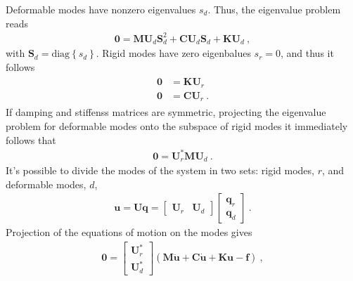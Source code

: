 \documentclass[letterpaper,10pt,english]{jupyterBook}
\begin{document}
\sphinxAtStartPar
Deformable modes have non\sphinxhyphen{}zero eigenvalues \(s_d\). Thus, the eigenvalue problem reads
\begin{equation*}
\begin{split}\mathbf{0} = \mathbf{M} \mathbf{U}_d \mathbf{S}^2_d + \mathbf{C} \mathbf{U}_d \mathbf{S}_d + \mathbf{K} \mathbf{U}_d \ ,\end{split}
\end{equation*}
\sphinxAtStartPar
with \(\mathbf{S}_d = \text{diag}\left\{ s_d \right\}\). Rigid modes have zero eigenbalues \(s_r = 0\), and thus it follows
\begin{equation*}
\begin{split}\begin{aligned}
  \mathbf{0} & = \mathbf{K} \mathbf{U}_r \\
  \mathbf{0} & = \mathbf{C} \mathbf{U}_r \ .
\end{aligned}\end{split}
\end{equation*}
\sphinxAtStartPar
If damping and stiffenss matrices are symmetric, projecting the eigenvalue problem for deformable modes onto the subspace of rigid modes it immediately follows that
\begin{equation*}
\begin{split}\mathbf{0} = \mathbf{U}_r^* \mathbf{M} \mathbf{U}_d \ .\end{split}
\end{equation*}
\sphinxAtStartPar
It’s possible to divide the modes of the system in two sets: rigid modes, \(r\), and deformable modes, \(d\),
\begin{equation*}
\begin{split}\mathbf{u} = \mathbf{U} \mathbf{q} = \begin{bmatrix} \mathbf{U}_r & \mathbf{U}_d \end{bmatrix} \begin{bmatrix} \mathbf{q}_r \\ \mathbf{q}_d \end{bmatrix} \ .\end{split}
\end{equation*}
\sphinxAtStartPar
Projection of the equations of motion on the modes gives
\begin{equation*}
\begin{split}\mathbf{0} = \begin{bmatrix} \mathbf{U}_r^* \\ \mathbf{U}_d^* \end{bmatrix} \left( \mathbf{M} \ddot{\mathbf{u}} + \mathbf{C} \dot{\mathbf{u}} + \mathbf{K} \mathbf{u} - \mathbf{f}  \right) \ ,\end{split}
\end{equation*}
\end{document}

